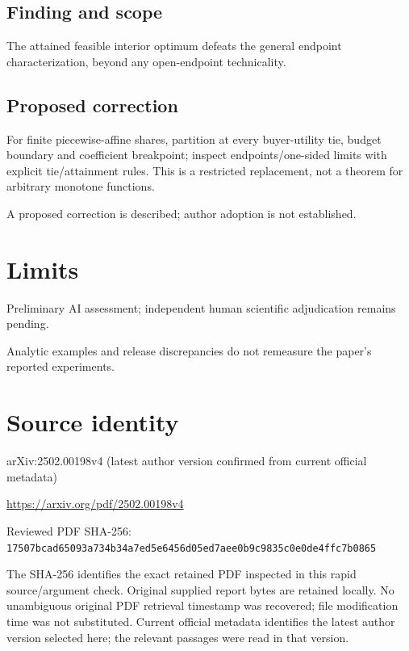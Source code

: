 \documentclass[11pt]{article}
\begin{document}
\subsection*{Finding and scope}

The attained feasible interior optimum defeats the general endpoint characterization, beyond any open-endpoint technicality.

\subsection*{Proposed correction}

For finite piecewise-affine shares, partition at every buyer-utility tie, budget boundary and coefficient breakpoint; inspect endpoints/one-sided limits with explicit tie/attainment rules. This is a restricted replacement, not a theorem for arbitrary monotone functions.

A proposed correction is described; author adoption is not established.

\section*{Limits}

Preliminary AI assessment; independent human scientific adjudication remains pending.\par

Analytic examples and release discrepancies do not remeasure the paper’s reported experiments.\par

\section*{Source identity}

arXiv:2502.00198v4 (latest author version confirmed from current official metadata)

\url{https://arxiv.org/pdf/2502.00198v4}

Reviewed PDF SHA-256: \nolinkurl{17507bcad65093a734b34a7ed5e6456d05ed7aee0b9c9835c0e0de4ffc7b0865}

The SHA-256 identifies the exact retained PDF inspected in this rapid source/argument check. Original supplied report bytes are retained locally. No unambiguous original PDF retrieval timestamp was recovered; file modification time was not substituted. Current official metadata identifies the latest author version selected here; the relevant passages were read in that version.
\end{document}
